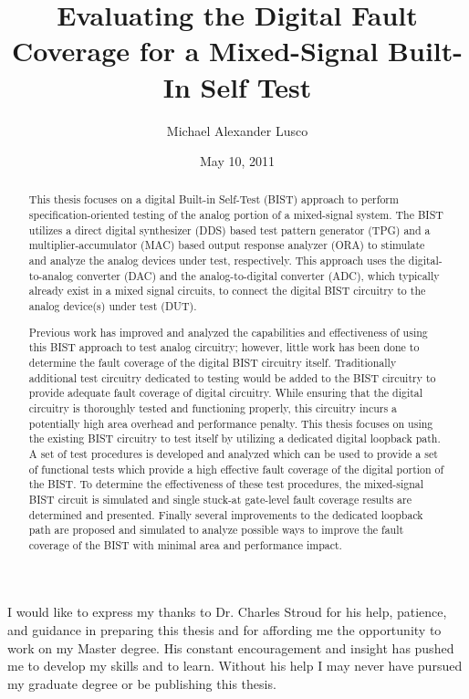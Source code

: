 \documentclass[12pt]{report}
\title{Evaluating the Digital Fault Coverage for a Mixed-Signal Built-In Self Test}
\author{Michael Alexander Lusco}
\date{May 10, 2011} %
\begin{document}
\begin{romanpages}      %

\TitlePage 

\begin{abstract}
This thesis focuses on a digital Built-in Self-Test (BIST) approach to perform specification-oriented testing of the analog portion of a mixed-signal system.  The BIST utilizes a direct digital synthesizer (DDS) based test pattern generator (TPG) and a multiplier-accumulator (MAC) based output response analyzer (ORA) to stimulate and analyze the analog devices under test, respectively.  This approach uses the digital-to-analog converter (DAC) and the analog-to-digital converter (ADC), which typically already exist in a mixed signal circuits, to connect the digital BIST circuitry to the analog device(s) under test (DUT).

Previous work has improved and analyzed the capabilities and effectiveness of using this BIST approach to test analog circuitry; however, little work has been done to determine the fault coverage of the digital BIST circuitry itself.  Traditionally additional test circuitry dedicated to testing would be added to the BIST circuitry to provide adequate fault coverage of digital circuitry.  While ensuring that the digital circuitry is thoroughly tested and functioning properly, this circuitry incurs a potentially high area overhead and performance penalty.  This thesis focuses on using the existing BIST circuitry to test itself by utilizing a dedicated digital loopback path.  A set of test procedures is developed and analyzed which can be used to provide a set of functional tests which provide a high effective fault coverage of the digital portion of the BIST.  To determine the effectiveness of these test procedures, the mixed-signal BIST circuit is simulated and single stuck-at gate-level fault coverage results are determined and presented.  Finally several improvements to the dedicated loopback path are proposed and simulated to analyze possible ways to improve the fault coverage of the BIST with minimal area and performance impact.
\end{abstract}

\begin{acknowledgments}
I would like to express my thanks to Dr. Charles Stroud for his help, patience, and guidance in preparing this thesis and for affording me the opportunity to work on my Master degree.  His constant encouragement and insight has pushed me to develop my skills and to learn.  Without his help I may never have pursued my graduate degree or be publishing this thesis.


\end{acknowledgments}
\end{romanpages}
\end{document}
